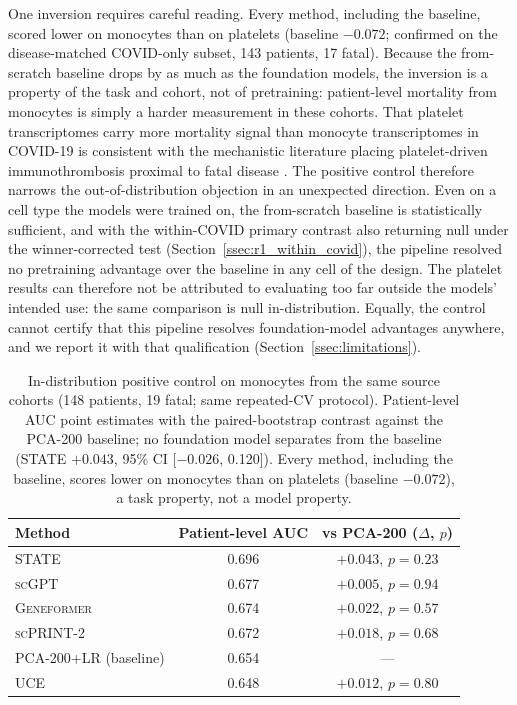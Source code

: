 \documentclass[11pt,a4paper]{article}
\newcommand{\model}[1]{\textsc{#1}}
\begin{document}
One inversion requires careful reading. Every method, including the baseline,
scored lower on monocytes than on platelets (baseline $-0.072$; confirmed on
the disease-matched COVID-only subset, 143 patients, 17 fatal). Because the
from-scratch baseline drops by as much as the foundation models, the inversion
is a property of the task and cohort, not of pretraining: patient-level
mortality from monocytes is simply a harder measurement in these cohorts. That
platelet transcriptomes carry more mortality signal than monocyte
transcriptomes in COVID-19 is consistent with the mechanistic literature
placing platelet-driven immunothrombosis proximal to fatal disease
\citep{manne2020platelet,barrett2021platelets}. The positive control therefore narrows the out-of-distribution
objection in an unexpected direction. Even on a cell type the models were
trained on, the from-scratch baseline is statistically sufficient, and with
the within-COVID primary contrast also returning null under the
winner-corrected test (Section~\ref{ssec:r1_within_covid}), the pipeline
resolved no pretraining advantage over the baseline in any cell of the
design. The platelet results can therefore not be attributed to evaluating
too far outside the models' intended use: the same comparison is null
in-distribution. Equally, the control cannot certify that this pipeline
resolves foundation-model advantages anywhere, and we report it with that
qualification (Section~\ref{ssec:limitations}).

\begin{table}[t]
\centering
\caption{In-distribution positive control on monocytes from the same source
cohorts (148 patients, 19 fatal; same repeated-CV protocol). Patient-level
AUC point estimates with the paired-bootstrap contrast against the PCA-200
baseline; no foundation model separates from the baseline
(\model{STATE} $+0.043$, 95\% CI [$-0.026$, 0.120]). Every method, including
the baseline, scores lower on monocytes than on platelets (baseline
$-0.072$), a task property, not a model property.}
\label{tab:monocyte}
\small
\begin{tabular}{lcc}
\toprule
\textbf{Method} & \textbf{Patient-level AUC} & \textbf{vs PCA-200 ($\Delta$, $p$)} \\
\midrule
\model{STATE} & 0.696 & $+0.043$, $p = 0.23$ \\
\model{scGPT} & 0.677 & $+0.005$, $p = 0.94$ \\
\model{Geneformer} & 0.674 & $+0.022$, $p = 0.57$ \\
\model{scPRINT-2} & 0.672 & $+0.018$, $p = 0.68$ \\
PCA-200+LR (baseline) & 0.654 & --- \\
\model{UCE} & 0.648 & $+0.012$, $p = 0.80$ \\
\bottomrule
\end{tabular}
\end{table}
\end{document}
